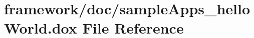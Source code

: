 \hypertarget{sample_apps__hello_world_8dox}{}\section{framework/doc/sample\+Apps\+\_\+hello\+World.dox File Reference}
\label{sample_apps__hello_world_8dox}
